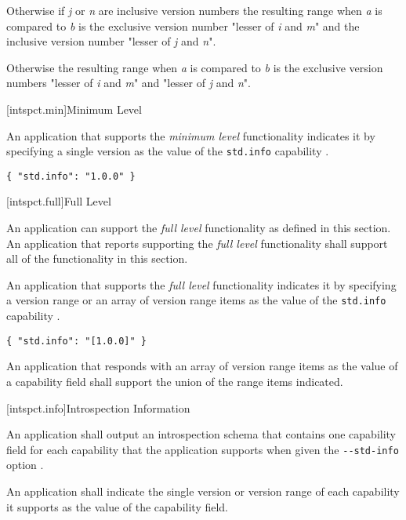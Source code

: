 \pnum
Otherwise if \emph{j} or \emph{n} are inclusive version numbers the resulting
range when \emph{a} is compared to \emph{b} is the exclusive version number
"lesser of \emph{i} and \emph{m}" and the inclusive version number "lesser of
\emph{j} and \emph{n}".

\pnum
Otherwise the resulting range when \emph{a} is compared to \emph{b} is the
exclusive version numbers "lesser of \emph{i} and \emph{m}" and "lesser of
\emph{j} and \emph{n}".

[intspct.min]{Minimum Level}

\pnum
An application that supports the \emph{minimum level} functionality indicates
it by specifying a single version  as the value of the
\verb|std.info| capability .

\begin{example}
\verb|{ "std.info": "1.0.0" }|
\end{example}

[intspct.full]{Full Level}

\pnum
An application can support the \emph{full level} functionality as defined in
this section. An application that reports supporting the \emph{full level}
functionality shall support all of the functionality in this section.

\pnum
An application that supports the \emph{full level} functionality indicates it by
specifying a version range  or an array of version
range items as the value of the \verb|std.info| capability  .

\begin{example}
\verb|{ "std.info": "[1.0.0]" }|
\end{example}

An application that responds with an array of version range items as the value
of a capability field shall support the union of the range items indicated.

[intspct.info]{Introspection Information}

\pnum
An application shall output an introspection schema  that
contains one capability field for each capability that the application supports
when given the \verb|--std-info| option .

\pnum
An application shall indicate the single version  or
version range  of each capability it supports as the
value of the capability field.

